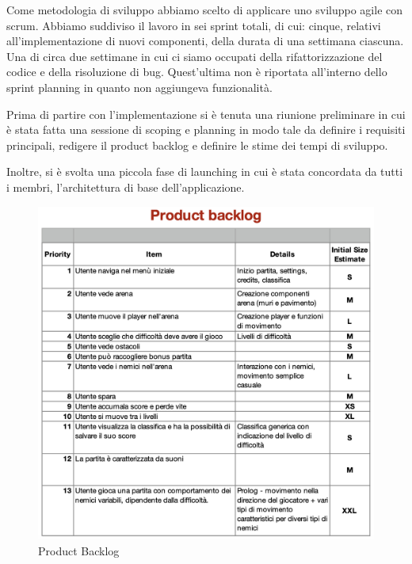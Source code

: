 Come metodologia di sviluppo abbiamo scelto di applicare uno sviluppo agile con scrum.
Abbiamo suddiviso il lavoro in sei sprint totali, di cui: cinque, relativi all'implementazione di nuovi componenti, della durata di una settimana ciascuna. Una di circa due settimane in cui ci siamo occupati della rifattorizzazione del codice e della risoluzione di bug. Quest'ultima non è riportata all'interno dello sprint planning in quanto non aggiungeva funzionalità.

Prima di partire con l'implementazione si è tenuta una riunione preliminare in cui è stata fatta una sessione di scoping e planning in modo tale da definire i requisiti principali, redigere il product backlog e definire le stime dei tempi di sviluppo.

Inoltre, si è svolta una piccola fase di launching in cui è stata concordata da tutti i membri, l'architettura di base dell'applicazione.

\begin{figure}[H]
\centering
  \includegraphics[width=13cm]{res/backlog.png}
  \caption{Product Backlog}
  \label{notifyAction}
\end{figure}
